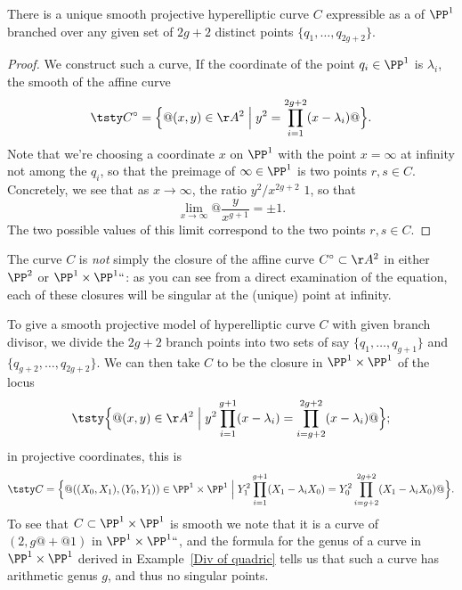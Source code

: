 \begin{theorem}
\label{hyperelliptic existence}
There is a unique smooth projective hyperelliptic curve $C$ expressible
%
as a
%
of $\PP^1$ branched over any given set of $2g+2$
distinct points $\{q_{1}, \dots, q_{2g+2}\}$.
\unif
\end{theorem}

\begin{proof}
We
construct such a curve,
If the coordinate of the point $q_i \in \PP^1$ is $\lambda_i$,
the smooth
\label{projective model}%
of the affine curve
  $$
 \tsty\let\big\Big
C^\circ = \big\{@(x,y) \in \AA^2 \bigm|  y^2 = \prod\limits_{i=1}^{2g+2}
(x - \lambda_i)@\big\}.
$$
Note that we're choosing a coordinate $x$ on $\PP^1$ with the point
$x = \infty$ at infinity not among the $q_i$, so that the preimage of
$\infty \in \PP^1$ is two points $r, s \in C$. Concretely, we see that
as $x \to \infty$, the ratio $y^2/x^{2g+2}$
$1$, so that
$$
\lim_{x \to \infty} @ \frac{y}{x^{g+1}}  =  \pm 1.
$$
  The two possible values of this limit correspond to the two points
  $r,s \in C$.
\end{proof}

The curve $C$
is \emph{not} simply the closure of the affine curve
$C^\circ \subset \AA^2$ in either $\PP^2$ or $\PP^1 \times \PP^1` `$: as
you can see from a direct examination of the equation, each of these
closures will be singular at the (unique) point at infinity.

To give a smooth projective model of
hyperelliptic curve $C$ with
given branch divisor, we divide the $2g+2$ branch points  into two sets
of
say
 $\{q_1,\dots,q_{g+1}\}$ and $\{q_{g+2}, \dots,
q_{2g+2}\}$. We can then take $C$ to be the closure in $\PP^1 \times \PP^1$
of the  locus
  $$
 \tsty\let\big\Big
  \big\{@(x,y) \in \AA^2  \bigm|  y^2\prod\limits_{i=1}^{g+1} (x - \lambda_i)
  = \prod\limits_{i=g+2}^{2g+2} (x - \lambda_i)@\big\};
  $$
  in projective coordinates, this is
   $$
 \tsty\let\big\Big
  C  =  \big\{@((X_{0},X_{1}), (Y_{0},Y_{1})) \in \PP^1 \times
  \PP^1  \bigm|  Y_1^2\prod\limits_{i=1}^{g+1} (X_1 - \lambda_iX_0) =
  Y_0^2\prod\limits_{i=g+2}^{2g+2} (X_1 - \lambda_iX_0)@\big\}.
  $$
To see that $C \subset \PP^1 \times \PP^1$ is smooth we note that it is a
curve of
%
$(2,g@{+}@1)$ in $\PP^1 \times \PP^1` `$, and the formula for
the genus of a curve in $\PP^1 \times \PP^1$ derived in
Example~\ref{Div of quadric} tells us that such a curve has
arithmetic genus $g$, and thus no singular points.

